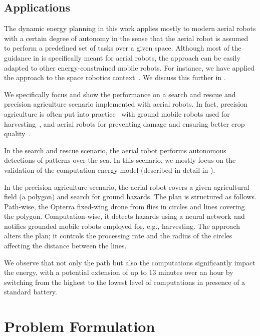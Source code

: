 \subsection{Applications}

The dynamic energy planning in this work applies mostly to modern aerial robots with a certain degree of autonomy in the sense that the aerial robot is assumed to perform a predefined set of tasks over a given space. Although most of the guidance in  is specifically meant for aerial robots, the approach can be easily adapted to other energy-constrained mobile robots. For instance, we have applied the approach to the space robotics context~\citep{seewald2020beyond}. We discuss this further in .

We specifically focus and show the performance on a search and rescue and precision agriculture scenario implemented with aerial robots. In fact, precision agriculture is often put into practice~\citep{hajjaj2014review} with ground mobile robots used for harvesting~\citep{qingchun2012study,dong2011development, de2011design, aljanobi2010setup, li2008analysis, edan2000robotic}, and aerial robots for preventing damage and ensuring better crop quality~\citep{puri2017agriculture, daponte2019review}. 

In the search and rescue scenario, the aerial robot performs autonomous detections of patterns over the sea. In this scenario, we mostly focus on the validation of the computation energy model (described in detail in \fref{}{}).

In the precision agriculture scenario, the aerial robot covers a given agricultural field (a polygon) and search for ground hazards. The plan is structured as follows. Path-wise, the Opterra fixed-wing drone from  flies in circles and lines covering the polygon. Computation-wise, it detects hazards using a neural network and notifies grounded mobile robots employed for, e.g., harvesting. The approach alters the plan; it controls the processing rate and the radius of the circles affecting the distance between the lines. 

We observe that not only the path but also the computations significantly impact the energy, with a potential extension of up to 13 minutes over an hour by switching from the highest to the lowest level of computations in presence of a standard battery.

\section{Problem Formulation}
\label{sec:pb-form}

